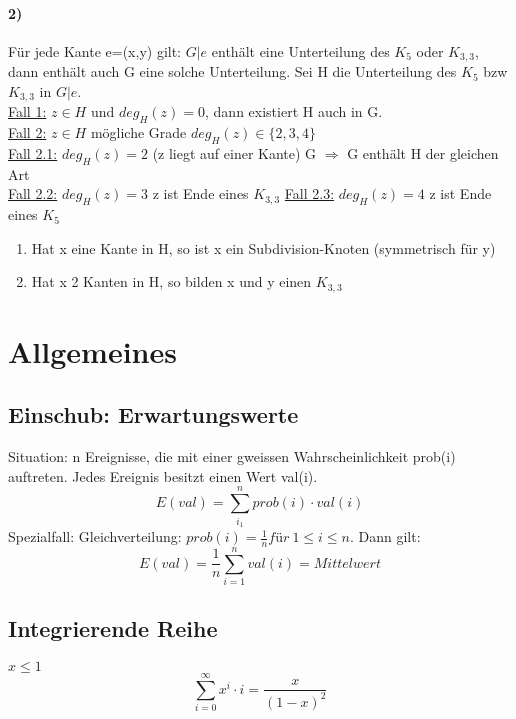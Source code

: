 \paragraph{2)} Für jede Kante e=(x,y) gilt: $ G|e $ enthält eine Unterteilung des $ K_5 $ oder $ K_{3,3} $, dann enthält auch G eine solche Unterteilung. Sei H die Unterteilung des $ K_5 $ bzw $ K_{3,3} $ in $ G|e $.\\
\underline{Fall 1:} $ z \in H $ und $ deg_H(z)=0 $, dann existiert H auch in G. \\
\underline{Fall 2:} $ z \in H$ mögliche Grade  $ deg_H(z) \in \{2, 3, 4 \} $ \\
\underline{Fall 2.1:} $ deg_H(z) = 2 $ (z liegt auf einer Kante) G $ \Rightarrow $ G enthält H der gleichen Art \\
\underline{Fall 2.2:} $ deg_H(z) = 3 $ z ist Ende eines $ K_{3,3} $
\underline{Fall 2.3:} $ deg_H(z) = 4 $ z ist Ende eines $ K_{5} $
\begin{enumerate}
    \item Hat x eine Kante in H, so ist x ein Subdivision-Knoten (symmetrisch für y)
    \item Hat x 2 Kanten in H, so bilden x und y einen $ K_{3,3} $
\end{enumerate}



\section{Allgemeines}
\subsection{Einschub: Erwartungswerte}
Situation: n Ereignisse, die mit einer gweissen Wahrscheinlichkeit prob(i) auftreten. Jedes Ereignis besitzt einen Wert val(i). 
$$E(val) = \sum_{i_1}^{n} prob(i)\cdot val(i) $$
Spezialfall: Gleichverteilung: $ prob(i)=\frac{1}{n} für\ 1\leq i \leq n $. Dann gilt:
$$ E(val)= \frac{1}{n} \sum_{i=1}^{n}val(i) = Mittelwert $$

\subsection{Integrierende Reihe}
$ x \leq 1 $
$$ \sum_{i=0}^\infty x^i \cdot i = \frac{x}{(1-x)^2}$$




